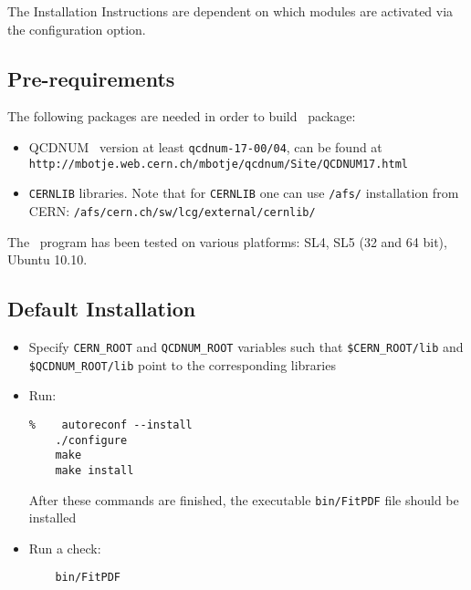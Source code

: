 
\label{sec:install}

The Installation Instructions are dependent on which modules are activated via the configuration option. 
\subsection{Pre-requirements}

The following packages are needed in order to build \fitter\ package:
\begin{itemize}
\item QCDNUM~\cite{qcdnum} version at least {\tt qcdnum-17-00/04}, can be found at \\
  {\tt http://mbotje.web.cern.ch/mbotje/qcdnum/Site/QCDNUM17.html}
\item {\tt CERNLIB} libraries. Note that for {\tt CERNLIB} one can use {\tt /afs/} installation from CERN:
  {\tt /afs/cern.ch/sw/lcg/external/cernlib/}
\end{itemize}
The \fitter\ program has been tested on various platforms: 
   SL4, SL5 (32 and 64 bit),  Ubuntu 10.10.
\subsection{Default Installation}
\begin{itemize}
\item
 Specify {\tt CERN\_ROOT} 
     and {\tt QCDNUM\_ROOT} variables such that 
     {\tt \$CERN\_ROOT/lib}  and {\tt \$QCDNUM\_ROOT/lib}
 point to the corresponding libraries
\item Run:
\begin{verbatim}
%    autoreconf --install
    ./configure
    make 
    make install
\end{verbatim}
After these commands are finished, the executable {\tt bin/FitPDF} 
file should be installed
\item  Run a check:
\begin{verbatim}
    bin/FitPDF 
\end{verbatim}
\end{itemize}
